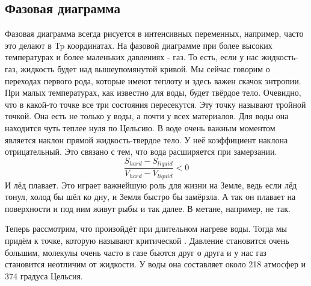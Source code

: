 \documentclass[a4paper, 12pt]{article}
\begin{document}
	\subsection{Фазовая диаграмма}
	Фазовая диаграмма всегда рисуется в интенсивных переменных, например, часто это делают в Tp координатах. На фазовой диаграмме при более высоких температурах и более маленьких давлениях - газ. То есть, если у нас жидкость-газ, жидкость будет над вышеупомянутой кривой. Мы сейчас говорим о переходах первого рода, которые имеют теплоту и здесь важен скачок энтропии. При малых температурах, как известно для воды, будет твёрдое тело. Очевидно, что в какой-то точке все три состояния пересекутся. Эту точку называют тройной точкой. Она есть не только у воды, а почти у всех материалов. Для воды она находится чуть теплее нуля по Цельсию. В воде очень важным моментом является наклон прямой жидкость-твердое тело. У неё коэффициент наклона отрицательный. Это связано с тем, что вода расширяется при замерзании.
	\begin{equation*}
		\frac{S_{hard}-S_{liquid}}{V_{hard}-V_{liquid}} < 0 
	\end{equation*}
	И лёд плавает. Это играет важнейшую роль для жизни на Земле, ведь если лёд тонул, холод бы шёл ко дну, и Земля быстро бы замёрзла. А так он плавает на поверхности и под ним живут рыбы и так далее. В метане, например, не так. 
	
	Теперь рассмотрим, что произойдёт при длительном нагреве воды. Тогда мы придём к точке, которую называют критической . Давление становится очень большим, молекулы очень часто в газе бьются друг о друга и у нас газ становится неотличим от жидкости. У воды она составляет около 218 атмосфер и 374 градуса Цельсия.
	
\end{document}
